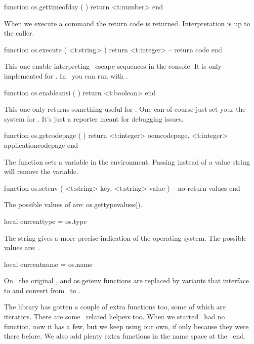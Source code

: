 \starttyping[option=LUA]
function os.gettimeofday ( )
    return <t:number>
end
\stoptyping

When we execute a command the return code is returned. Interpretation is up to
the caller.

\starttyping[option=LUA]
function os.execute ( <t:string> )
    return <t:integer> -- return code
end
\stoptyping

This one enable interpreting \ANSI\ escape sequences in the console. It is only
implemented for \MSWINDOWS. In \CONTEXT\ you can run with .

\starttyping[option=LUA]
function os.enableansi ( )
    return <t:boolean>
end
\stoptyping

This one only returns something useful for \MSWINDOWS. One can of course just set
your the system for . It's just a reporter meant for debugging issues.

\starttyping[option=LUA]
function os.getcodepage ( )
    return
        <t:integer> oemcodepage,
        <t:integer> applicationcodepage
end
\stoptyping

The  function sets a variable in the environment. Passing
 instead of a value string will remove the variable.

\starttyping[option=LUA]
function os.setenv (
    <t:string> key,
    <t:string> value
)
    -- no return values
end
\stoptyping

The possible values of  are: \showenginekeylist
{os.gettypevalues()}.

\starttyping[option=LUA]
local currenttype = os.type
\stoptyping

The  string gives a more precise indication of the operating
system. The possible values are: .

\starttyping[option=LUA]
local currentname = os.name
\stoptyping

On \MSWINDOWS\ the original ,  and \type
{os.getenv} functions are replaced by variants that interface to and convert from
\ to .

\stopsubsection

\startsubsection[title=Extra string helpers]

The  library has gotten a couple of extra functions too, some of
which are iterators. There are some \UNICODE\ related helpers too. When we
started \LUA\ had no  function, now it has a few, but we keep using our own,
if only because they were there before. We also add plenty extra functions in the
 name space at the \LUA\ end.

